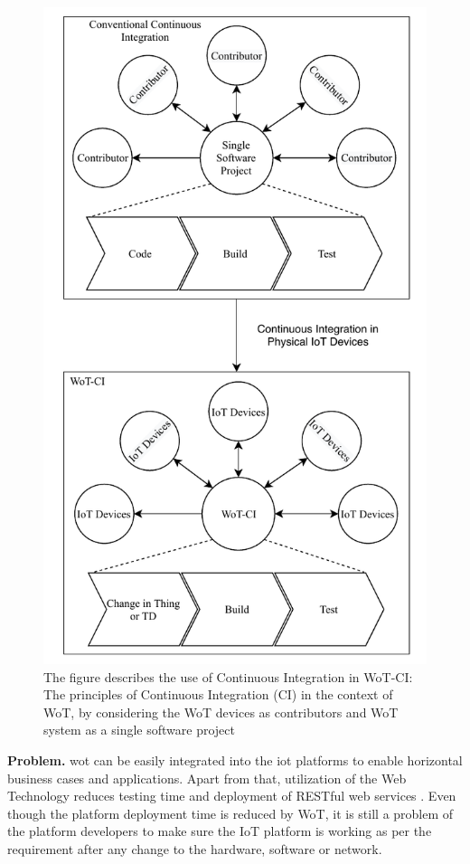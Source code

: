 \documentclass[conference]{IEEEtran}
\theoremstyle{definition}
\begin{document}
\begin{figure}[t]
  \centerline{\includegraphics[scale=0.6]{iotSystem} }
  
  \caption{The figure describes the use of Continuous Integration in WoT-CI: The principles of Continuous Integration (CI) in the context of WoT, by considering the WoT devices as contributors and WoT system as a single software project}
  \label{fig:WoT-CI}
\end{figure}

\textbf{Problem. }\ac{wot} can be easily integrated into the \ac{iot} platforms to enable horizontal business cases and applications. 
Apart from that, utilization of the Web Technology reduces testing time and deployment of RESTful web services \cite{datta2018advances}.
Even though the platform deployment time is reduced by WoT, it is still a problem of the platform developers to make sure the IoT platform is working as per the requirement after any change to the hardware, software or network.
\end{document}
